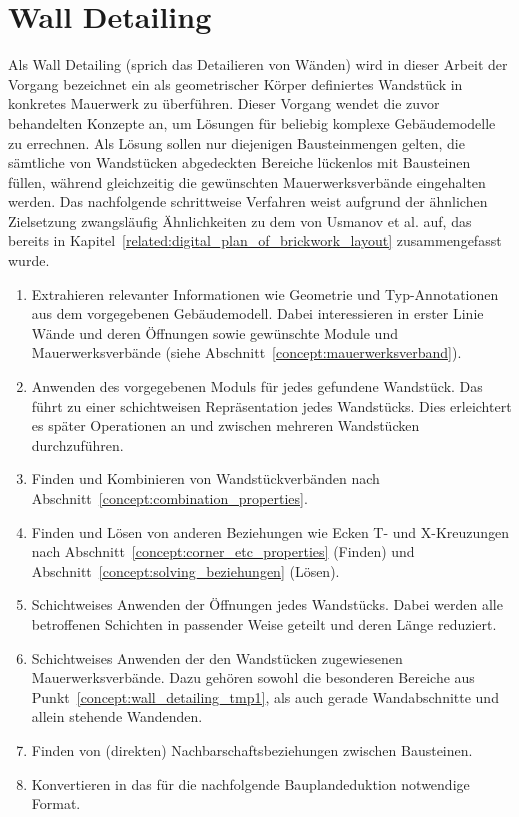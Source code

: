 \section{Wall Detailing}\label{concept:wall_detailing}
Als \glqq{}Wall Detailing\grqq{} (sprich das \glqq{}Detailieren von Wänden\grqq{}) wird in dieser Arbeit der Vorgang bezeichnet ein als geometrischer Körper definiertes Wandstück in konkretes Mauerwerk zu überführen.
Dieser Vorgang wendet die zuvor behandelten Konzepte an, um Lösungen für beliebig komplexe Gebäudemodelle zu errechnen.
Als Lösung sollen nur diejenigen Bausteinmengen gelten, die sämtliche von Wandstücken abgedeckten Bereiche lückenlos mit Bausteinen füllen, während gleichzeitig die gewünschten Mauerwerksverbände eingehalten werden.
Das nachfolgende schrittweise Verfahren weist aufgrund der ähnlichen Zielsetzung zwangsläufig Ähnlichkeiten zu dem von Usmanov et al. auf, das bereits in Kapitel~\ref{related:digital_plan_of_brickwork_layout} zusammengefasst wurde.

\begin{enumerate}
    \item Extrahieren relevanter Informationen wie Geometrie und Typ-Annotationen aus dem vorgegebenen Gebäudemodell. Dabei interessieren in erster Linie Wände und deren Öffnungen sowie gewünschte Module und Mauerwerksverbände (siehe Abschnitt~\ref{concept:mauerwerksverband}).
    \item Anwenden des vorgegebenen Moduls für jedes gefundene Wandstück. Das führt zu einer schichtweisen Repräsentation jedes Wandstücks. Dies erleichtert es später Operationen an und zwischen mehreren Wandstücken durchzuführen.
    \item Finden und Kombinieren von Wandstückverbänden nach Abschnitt~\ref{concept:combination_properties}.
    \item\label{concept:wall_detailing_tmp1} Finden und Lösen von anderen Beziehungen wie Ecken T- und X-Kreuzungen nach Abschnitt~\ref{concept:corner_etc_properties} (Finden) und Abschnitt~\ref{concept:solving_beziehungen} (Lösen).
    \item Schichtweises Anwenden der Öffnungen jedes Wandstücks. Dabei werden alle betroffenen Schichten in passender Weise geteilt und deren Länge reduziert.
    \item Schichtweises Anwenden der den Wandstücken zugewiesenen Mauerwerksverbände. Dazu gehören sowohl die besonderen Bereiche aus Punkt~\ref{concept:wall_detailing_tmp1}, als auch gerade Wandabschnitte und allein stehende Wandenden.
    \item\label{concept:wall_detailing_tmp2} Finden von (direkten) Nachbarschaftsbeziehungen zwischen Bausteinen.
    \item Konvertieren in das für die nachfolgende Bauplandeduktion notwendige Format.
\end{enumerate}

